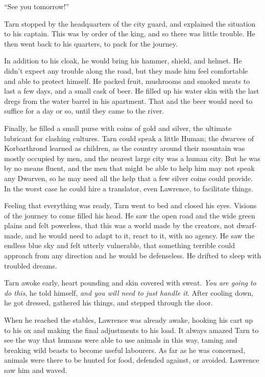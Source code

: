 ``See you tomorrow!''

Tarn stopped by the headquarters of the city guard, and explained the situation to his captain.  This was by order of the king, and so there was little trouble.  He then went back to his quarters, to pack for the journey.

In addition to his cloak, he would bring his hammer, shield, and helmet.  He didn't expect any trouble along the road, but they made him feel comfortable and able to protect himself.  He packed fruit, mushrooms and smoked meats to last a few days, and a small cask of beer.  He filled up his water skin with the last dregs from the water barrel in his apartment.  That and the beer would need to suffice for a day or so, until they came to the river.

Finally, he filled a small purse with coins of gold and silver, the ultimate lubricant for clashing cultures.  Tarn could speak a little Human; the dwarves of Korbarthrond learned as children, as the country around their mountain was mostly occupied by men, and the nearest large city was a human city.  But he was by no means fluent, and the men that might be able to help him may not speak any Dwarven, so he may need all the help that a few silver coins could provide.  In the worst case he could hire a translator, even Lawrence, to facilitate things.

Feeling that everything was ready, Tarn went to bed and closed his eyes.  Visions of the journey to come filled his head.  He saw the open road and the wide green plains and felt powerless, that this was a world made by the creators, not dwarf-made, and he would need to adapt to it, react to it, with no agency.  He saw the endless blue sky and felt utterly vulnerable, that something terrible could approach from any direction and he would be defenseless.  He drifted to sleep with troubled dreams.

Tarn awoke early, heart pounding and skin covered with sweat.  \emph{You are going to do this}, he told himself, \emph{and you will need to just handle it}.  After cooling down, he got dressed, gathered his things, and stepped through the door.

When he reached the stables, Lawrence was already awake, hooking his cart up to his ox and making the final adjustments to his load.  It always amazed Tarn to see the way that humans were able to use animals in this way, taming and breaking wild beasts to become useful labourers.  As far as he was concerned, animals were there to be hunted for food, defended against, or avoided.  Lawrence saw him and waved.

